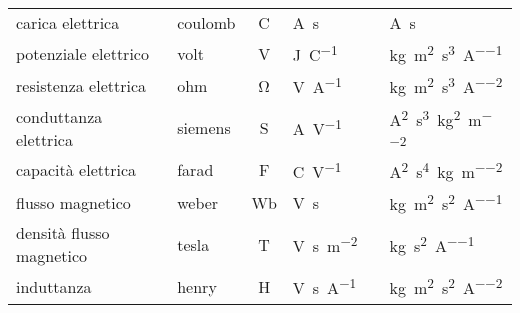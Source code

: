{\begin{tabular}{llclLl}
		carica elettrica & coulomb& \si{\coulomb}&\si{\ampere\second}&\dif{\si{\Corrente\Tempo}} & \si{\ampere\second} \\ 
		potenziale elettrico & volt& \si{\volt}&\si{\joule\per\coulomb}&\dif{\si{\Massa\Lunghezza\squared\per\Tempo\cubed\per\Corrente}} &\si{\kilogram\meter\squared\per\second\cubed\per\ampere}  \\ 
		resistenza elettrica & ohm& \si{\ohm}&\si{\volt\per\ampere}&\dif{\si{\per\Massa\per\Lunghezza\Tempo\cubed\per\Corrente\squared}} &\si{\kilogram\meter\squared\per\second\cubed\per\square\ampere}  \\ 
		conduttanza elettrica & siemens& \si{\siemens}&\si{\ampere\per\volt}&\dif{\si{\Corrente\squared\Tempo\cubed\per\Massa\per\Lunghezza\squared}} &\si{\ampere\squared\second\cubed\per\kilogram\squared\per\meter\squared}  \\ 
		capacità elettrica & farad& \si{\farad}&\si{\coulomb\per\volt}& &\si{\ampere\squared\second\tothe{4}\per\kilogram\per\meter\squared}  \\ 
		flusso magnetico & weber& \si{\weber}&\si{\volt\second}&\dif{\si{\Massa\Lunghezza\squared\per\Tempo\squared\per\Corrente}
		} &\si{\kg\meter\squared\per\second\squared\per\ampere}  \\ 
		densità flusso magnetico & tesla& \si{\tesla}&\si{\volt\second\per\meter\squared}&\dif{\si{\Massa\per\Tempo\squared\per\Corrente}} &\si{\kg\per\second\squared\per\ampere}  \\ 
		induttanza & henry& \si{\henry}&\si{\volt\second\per\ampere}&\dif{\si{\Massa\Lunghezza\squared\per\Tempo\squared\per\Corrente\squared}} &\si{\kg\meter\squared\per\second\squared\per\ampere\squared}  \\ 
		\bottomrule
	\end{tabular}\par}
